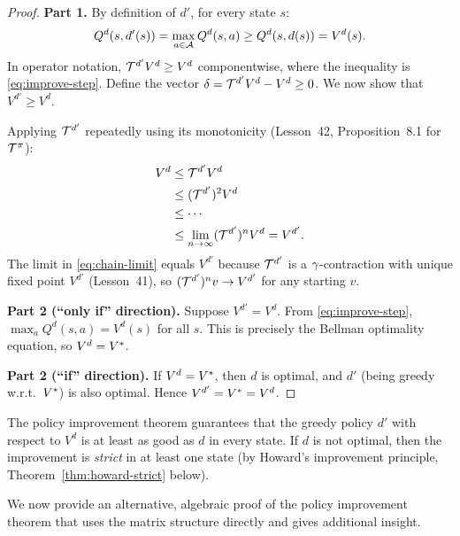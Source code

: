 \documentclass[11pt,a4paper]{article}
\begin{document}
\begin{proof}
\textbf{Part 1.} By definition of $d'$, for every state $s$:
\begin{equation}
\label{eq:improve-step}
    Q^d(s, d'(s)) = \max_{a \in \mathcal{A}} Q^d(s,a)
    \geq Q^d(s, d(s)) = V^d(s).
\end{equation}
In operator notation, $\mathcal{T}^{d'} V^d \geq V^d$ componentwise,
where the inequality is \eqref{eq:improve-step}. Define the vector
$\delta = \mathcal{T}^{d'} V^d - V^d \geq 0$. We now show that
$V^{d'} \geq V^d$.

Applying $\mathcal{T}^{d'}$ repeatedly using its monotonicity
(Lesson~42, Proposition~8.1 for $\mathcal{T}^\pi$):
\begin{align}
    V^d &\leq \mathcal{T}^{d'} V^d  \label{eq:chain1} \\
    &\leq (\mathcal{T}^{d'})^2 V^d  \label{eq:chain2} \\
    &\leq \cdots \nonumber \\
    &\leq \lim_{n \to \infty} (\mathcal{T}^{d'})^n V^d = V^{d'}.
    \label{eq:chain-limit}
\end{align}
The limit in \eqref{eq:chain-limit} equals $V^{d'}$ because
$\mathcal{T}^{d'}$ is a $\gamma$-contraction with unique fixed
point $V^{d'}$ (Lesson~41), so $(\mathcal{T}^{d'})^n v \to V^{d'}$
for any starting $v$.

\textbf{Part 2 (``only if'' direction).} Suppose $V^{d'} = V^d$.
From \eqref{eq:improve-step}, $\max_a Q^d(s,a) = V^d(s)$ for all
$s$. This is precisely the Bellman optimality equation, so
$V^d = V^*$.

\textbf{Part 2 (``if'' direction).} If $V^d = V^*$, then $d$ is
optimal, and $d'$ (being greedy w.r.t.\ $V^*$) is also optimal.
Hence $V^{d'} = V^* = V^d$.
\end{proof}

\begin{keyresult}[title={Policy Improvement Guarantee}]
\label{kr:pi-guarantee}
The policy improvement theorem guarantees that the greedy policy
$d'$ with respect to $V^d$ is at least as good as $d$ in every
state. If $d$ is not optimal, then the improvement is \emph{strict}
in at least one state (by Howard's improvement principle,
Theorem~\ref{thm:howard-strict} below).
\end{keyresult}

We now provide an alternative, algebraic proof of the policy
improvement theorem that uses the matrix structure directly and
gives additional insight.
\end{document}
